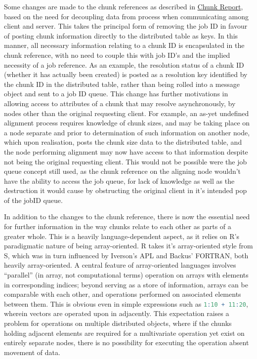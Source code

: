 \documentclass[a4paper,10pt]{article}
\begin{document}
Some changes are made to the chunk references as described in
\href{chunk-report.pdf}{Chunk Report}, based on the need for decoupling data
from process when communicating among client and server.
This takes the principal form of removing the job ID in favour of posting chunk
information directly to the distributed table as keys.
In this manner, all necessary information relating to a chunk ID is
encapsulated in the chunk reference, with no need to couple this with job ID's
and the implied necessity of a job reference.
As an example, the resolution status of a chunk ID (whether it has actually
been created) is posted as a resolution key identified by the chunk ID in the
distributed table, rather than being rolled into a message object and sent to a
job ID queue.
This change has further motivations in allowing access to attributes of a chunk
that may resolve asynchronously, by nodes other than the original requesting
client.
For example, an as-yet undefined alignment process requires knowledge of chunk
sizes, and may be taking place on a node separate and prior to determination of
such information on another node, which upon realisation, posts the chunk size
data to the distributed table, and the node performing alignment may now have
access to that information despite not being the original requesting client.
This would not be possible were the job queue concept still used, as the chunk
reference on the aligning node wouldn't have the ability to access the job
queue, for lack of knowledge as well as the destruction it would cause by
obstructing the original client in it's intended pop of the jobID queue.

In addition to the changes to the chunk reference, there is now the essential
need for further information in the way chunks relate to each other as parts of
a greater whole.
This is a heavily language-dependent aspect, as it relies on R's paradigmatic
nature of being array-oriented.
R takes it's array-oriented style from S, which was in turn influenced by
Iverson's APL and Backus' FORTRAN, both heavily
array-oriented\cite{becker1994shistory}\cite{iverson2007notation}.
A central feature of array-oriented languages involves ``parallel'' (in array,
not computational terms) operation on arrays with elements in corresponding
indices; beyond serving as a store of information, arrays can be comparable
with each other, and operations performed on associated elements between them.
This is obvious even in simple expressions such as 
\lstinline[language=R]{1:10 + 11:20}, wherein vectors are operated upon in
adjacently.
This expectation raises a problem for operations on multiple distributed
objects, where if the chunks holding adjacent elements are required for a
multivariate operation yet exist on entirely separate nodes, there is no
possibility for executing the operation absent movement of data.
\end{document}
